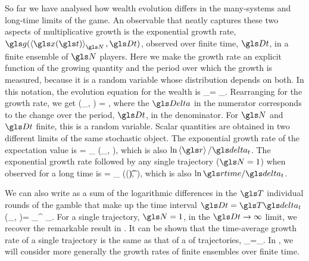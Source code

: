 
So far we have analysed how wealth evolution differs in the many-systems and long-time limits of the game. An observable that neatly captures these two aspects of multiplicative growth is the exponential growth rate, $\g(\ave{\x(\t)}_\N, \Dt)$, observed over finite time, $\Dt$, in a finite ensemble of $\N$ players. Here we make the growth rate an explicit function of the growing quantity and the period over which the growth is measured, because it is a random variable whose distribution depends on both. In this notation, the evolution equation for the \FEA wealth is
\be
\ave{\x(\t+\Dt)}_\N = \ave{\x(\t)}_\N \exp \left[ \g(\ave{\x(\t)}_\N, \Dt) \Dt \right].
\ee
Rearranging for the growth rate, we get
\be
\g(\ave{\x(\t)}_\N, \Dt) = \frac{\D \ln \ave{\x}_\N}{\Dt},
\ee
where the $\D$ in the numerator corresponds to the change over the period, $\Dt$, in the denominator. For $\N$ and $\Dt$ finite, this is a random variable. Scalar quantities are obtained in two different limits of the same stochastic object. The exponential growth rate of the expectation value is
\be
\ggave = \lim_{\N\to\infty} \g(\ave{\x(\t)}_\N, \Dt),
\ee
which is also $\ln \ave{\gr}/\dt$. The exponential growth rate followed by any single trajectory ($\N=1$) when observed for a long time is 
\be
\ggtime = \lim_{\Dt\to\infty} \g(\x(\t), \Dt),
\ee
which is also $\ln \grtime/\dt$.

We can also write  as a sum of the logarithmic differences in the $\T$ individual rounds of the gamble that make up the time interval $\Dt=\T \dt$
\be
\g(\ave{\x(\t)}_\N, \Dt)=  \sum_{}^{\T} \D\ln \ave{\x(\t+\gtau\dt)}_\N.
\ee
For a single trajectory, $\N=1$, in the $\Dt\to\infty$ limit, we recover the remarkable result in .
It can be shown \cite{PetersKlein2013} that the time-average growth rate of a single trajectory is the same as that of a \FEA of trajectories, \ie 
\be
\lim_{\Dt\to\infty}\frac{\D \ln \x}{\Dt}=\lim_{\Dt\to\infty}.
\ee
In , we will consider more generally the growth rates of finite ensembles over finite time.


